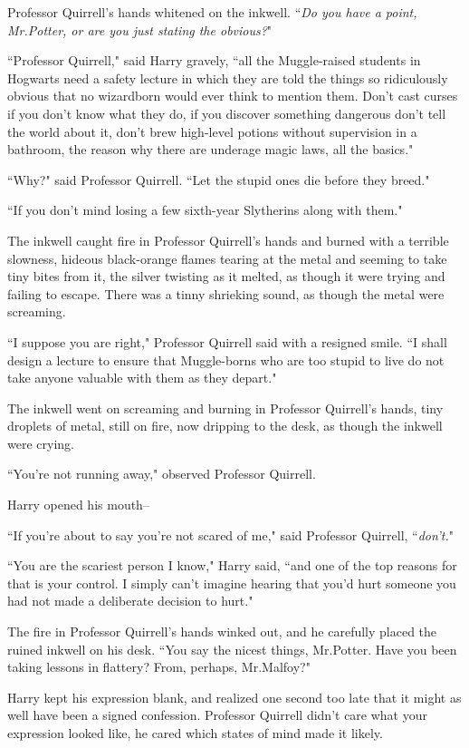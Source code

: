 Professor Quirrell's hands whitened on the inkwell. ``\emph{Do you have a point, Mr.\?Potter, or are you just stating the obvious?}"

``Professor Quirrell," said Harry gravely, ``all the Muggle-raised students in Hogwarts need a safety lecture in which they are told the things so ridiculously obvious that no wizardborn would ever think to mention them. Don't cast curses if you don't know what they do, if you discover something dangerous don't tell the world about it, don't brew high-level potions without supervision in a bathroom, the reason why there are underage magic laws, all the basics."

``Why?" said Professor Quirrell. ``Let the stupid ones die before they breed."

``If you don't mind losing a few sixth-year Slytherins along with them."

The inkwell caught fire in Professor Quirrell's hands and burned with a terrible slowness, hideous black-orange flames tearing at the metal and seeming to take tiny bites from it, the silver twisting as it melted, as though it were trying and failing to escape. There was a tinny shrieking sound, as though the metal were screaming.

``I suppose you are right," Professor Quirrell said with a resigned smile. ``I shall design a lecture to ensure that Muggle-borns who are too stupid to live do not take anyone valuable with them as they depart."

The inkwell went on screaming and burning in Professor Quirrell's hands, tiny droplets of metal, still on fire, now dripping to the desk, as though the inkwell were crying.

``You're not running away," observed Professor Quirrell.

Harry opened his mouth\---

``If you're about to say you're not scared of me," said Professor Quirrell, ``\emph{don't.}"

``You are the scariest person I know," Harry said, ``and one of the top reasons for that is your control. I simply can't imagine hearing that you'd hurt someone you had not made a deliberate decision to hurt."

The fire in Professor Quirrell's hands winked out, and he carefully placed the ruined inkwell on his desk. ``You say the nicest things, Mr.\?Potter. Have you been taking lessons in flattery? From, perhaps, Mr.\?Malfoy?"

Harry kept his expression blank, and realized one second too late that it might as well have been a signed confession. Professor Quirrell didn't care what your expression looked like, he cared which states of mind made it likely.

